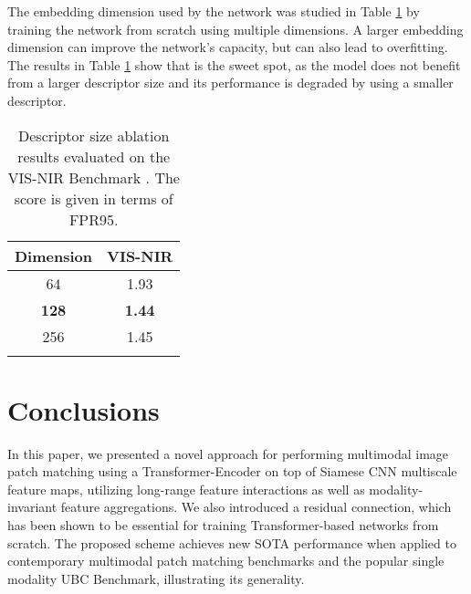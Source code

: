 \documentclass[10pt,journal]{IEEEtran}\usepackage{amsfonts}
\begin{document}
The embedding dimension used by the network was studied in Table \ref {table:ablation_desc} by training the network from scratch using multiple
dimensions. A larger embedding dimension can improve the network's capacity,
but can also lead to overfitting. The results in Table \ref {table:ablation_desc} show that  is the sweet spot, as the model does not benefit from a larger
descriptor size and its performance is degraded by using a smaller
descriptor.
\begin{table}[tbh]
\centering
\begin{tabular}{cc}
\toprule Dimension & VIS-NIR \\
\midrule 64 & 1.93 \\
\textbf{128} & \textbf{1.44} \\
256 & 1.45 \\
\bottomrule &
\end{tabular}\caption{Descriptor size ablation results evaluated on the VIS-NIR Benchmark
\protect\cite{SiameseCrossSpectral}. The score is given in terms of FPR95.}
\label{table:ablation_desc}
\end{table}

\section{Conclusions}

In this paper, we presented a novel approach for performing multimodal image
patch matching using a Transformer-Encoder on top of Siamese CNN multiscale
feature maps, utilizing long-range feature interactions as well as
modality-invariant feature aggregations. We also introduced a residual
connection, which has been shown to be essential for training
Transformer-based networks from scratch. The proposed scheme achieves new
SOTA performance when applied to contemporary multimodal patch matching
benchmarks and the popular single modality UBC Benchmark, illustrating its
generality.





\end{document}
